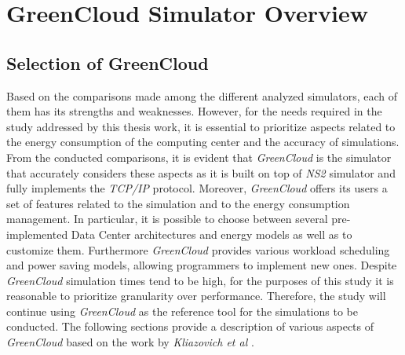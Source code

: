 \chapter{GreenCloud Simulator Overview}

\begin{citazione}

\end{citazione}
\newpage

\section{Selection of GreenCloud} 
Based on the comparisons made among the different analyzed simulators, each of them has its strengths and weaknesses. However, for the needs required in the study addressed by this thesis work, it is essential to prioritize aspects related to the energy consumption of the computing center and the accuracy of simulations. From the conducted comparisons, it is evident that \emph{GreenCloud} is the simulator that accurately considers these aspects as it is built on top of \emph{NS2} simulator and fully implements the \emph{TCP/IP} protocol. Moreover, \emph{GreenCloud} offers its users a set of features related to the simulation and to the energy consumption management. In particular, it is possible to choose between several pre-implemented Data Center architectures and energy models as well as to customize them. Furthermore \emph{GreenCloud} provides various workload scheduling and power saving models, allowing programmers to implement new ones. Despite \emph{GreenCloud} simulation times tend to be high, for the purposes of this study it is reasonable to prioritize granularity over performance. Therefore, the study will continue using \emph{GreenCloud} as the reference tool for the simulations to be conducted. The following sections provide a description of various aspects of \emph{GreenCloud} based on the work by \emph{Kliazovich et al} \cite{kliazovich2012greencloud}.



